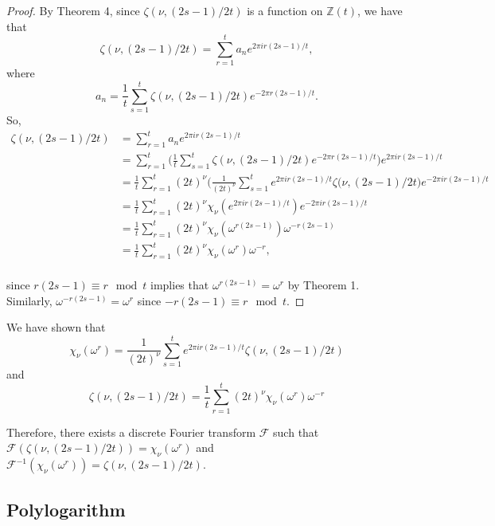 \documentclass[../article.tex]{subfiles}
\begin{document}
\begin{proof}
By Theorem 4, since $\zeta(\nu, (2s-1)/2t)$ is a function on $\mathbb{Z}(t)$, we have that
\begin{equation}
\zeta(\nu, (2s-1)/2t) = \sum_{r=1}^{t} a_{n} e^{2 \pi i r(2s-1)/t},
\end{equation}
where
\begin{equation}
a_n = \frac{1}{t} \sum_{s=1}^{t} \zeta(\nu, (2s-1)/2t) e^{-2 \pi r(2s-1)/t}.
\end{equation}
So,
\begin{equation}
\begin{split}
\zeta(\nu, (2s-1)/2t) &= \sum_{r=1}^{t} a_{n} e^{2 \pi i r(2s-1)/t} \\
&= \sum_{r=1}^{t} \Bigg(\frac{1}{t} \sum_{s=1}^{t} \zeta(\nu, (2s-1)/2t) e^{-2 \pi r(2s-1)/t}\Bigg)e^{2 \pi i r(2s-1)/t} \\
&= \frac{1}{t} \sum_{r=1}^{t} (2t)^{\nu} \Bigg(\frac{1}{(2t)^{\nu}} \sum_{s=1}^{t} e^{2 \pi ir(2s-1)/t} \zeta(\nu, (2s-1)/2t \Bigg) e^{-2 \pi ir(2s-1)/t} \\
&= \frac{1}{t} \sum_{r=1}^{t} (2t)^{\nu} \chi_{\nu}(e^{2 \pi ir(2s-1)/t})e^{-2 \pi ir(2s-1)/t} \\
&= \frac{1}{t} \sum_{r=1}^{t} (2t)^{\nu} \chi_{\nu}(\omega^{r(2s-1)})\omega^{-r(2s-1)} \\
&= \frac{1}{t} \sum_{r=1}^{t} (2t)^{\nu} \chi_{\nu}(\omega^{r})\omega^{-r}, \\
\end{split}
\end{equation}

since $r(2s-1) \equiv r \mod t$ implies that $\omega^{r(2s-1)} = \omega^{r}$ by Theorem 1. Similarly, $\omega^{-r(2s-1)} = \omega^{r}$ since $-r(2s-1) \equiv r \mod t$.
\end{proof}

We have shown that
\begin{equation}
\chi_{\nu}(\omega^r) = \frac{1}{(2t)^{\nu}} \sum_{s=1}^{t} e^{2 \pi ir(2s-1)/t} \zeta(\nu, (2s-1)/2t)
\end{equation}
and
\begin{equation}
\zeta(\nu, (2s-1)/2t) = \frac{1}{t} \sum_{r=1}^{t} (2t)^{\nu} \chi_{\nu}(\omega^{r})\omega^{-r}
\end{equation}

Therefore, there exists a discrete Fourier transform $\mathcal{F}$ such that $\mathcal{F}(\zeta(\nu, (2s-1)/2t)) = \chi_{\nu}(\omega^r)$ and $\mathcal{F}^{-1}(\chi_{\nu}(\omega^r)) = \zeta(\nu, (2s-1)/2t)$.

\subsection{Polylogarithm}
\end{document}
